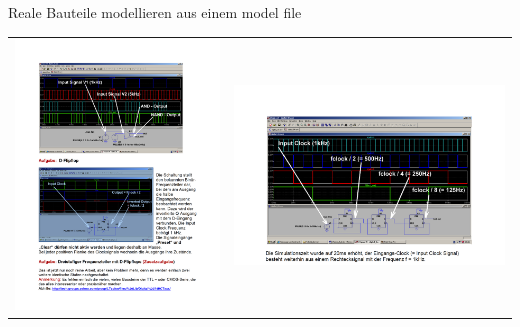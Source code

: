 \begin{frame}[t]{Reale Bauteile modellieren aus einem model file} 
    
    \begin{spacing}{0.9} \begin{tiny}
      \begin{table}[h!]
        \begin{tabular}{p{5cm} p{5cm}}
            \begin{minipage}{0.5\textwidth}                
                \includegraphics[width=\linewidth]{pictures/legacy/digi_3.png}
            \end{minipage} 
            &
            \begin{minipage}{0.5\textwidth}
                \includegraphics[width=\linewidth]{pictures/legacy/digi_4.png}

\end{minipage}
\end{tabular}
\end{table}
\end{tiny}
\end{spacing}
\end{frame}
